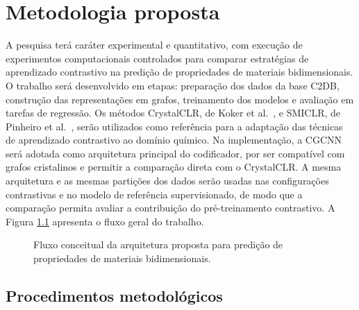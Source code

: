 
\chapter{Metodologia proposta}

A pesquisa terá caráter experimental e quantitativo, com execução de experimentos computacionais controlados para comparar estratégias de aprendizado contrastivo na predição de propriedades de materiais bidimensionais. O trabalho será desenvolvido em etapas: preparação dos dados da base C2DB, construção das representações em grafos, treinamento dos modelos e avaliação em tarefas de regressão. Os métodos CrystalCLR, de Koker et al.~\cite{koker2022graph}, e SMICLR, de Pinheiro et al.~\cite{Pinheiro2022}, serão utilizados como referência para a adaptação das técnicas de aprendizado contrastivo ao domínio químico.
Na implementação, a CGCNN será adotada como arquitetura principal do codificador, por ser compatível com grafos cristalinos e permitir a comparação direta com o CrystalCLR. A mesma arquitetura e as mesmas partições dos dados serão usadas nas configurações contrastivas e no modelo de referência supervisionado, de modo que a comparação permita avaliar a contribuição do pré-treinamento contrastivo. A Figura \ref{fig:arquitetura_proposta} apresenta o fluxo geral do trabalho.


\begin{figure}[htbp]
    \centering
    \caption{Fluxo conceitual da arquitetura proposta para predição de propriedades de materiais bidimensionais.}
    \label{fig:arquitetura_proposta}
    
\end{figure}


\section{Procedimentos metodológicos}

